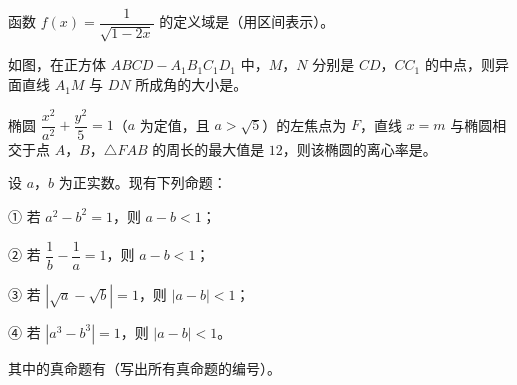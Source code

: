 \begin{question}
函数 $f(x)=\dfrac1{\sqrt{1-2x}}$ 的定义域是\gkblank{}（用区间表示）。

\Needspace{0.4\textheight}
\end{question}
\begin{question}
如图，在正方体 $ABCD-A_1B_1C_1D_1$ 中，$M$，$N$ 分别是 $CD$，$CC_1$ 的中点，则异面直线 $A_1M$ 与 $DN$ 所成角的大小是\gkblank{}。
\nopagebreak[4]
\begin{center}\end{center}
\nopagebreak[4]
\end{question}
\begin{question}
椭圆 $\dfrac{x^2}{a^2}+\dfrac{y^2}5=1$（$a$ 为定值，且 $a>\sqrt5$）的左焦点为 $F$，直线 $x=m$ 与椭圆相交于点 $A$，$B$，$\triangle FAB$ 的周长的最大值是 $12$，则该椭圆的离心率是\gkblank{}。

\end{question}
\begin{question}
设 $a$，$b$ 为正实数。现有下列命题：

① 若 $a^2-b^2=1$，则 $a-b<1$；

② 若 $\dfrac1b-\dfrac1a=1$，则 $a-b<1$；

③ 若 $|\sqrt a-\sqrt b|=1$，则 $|a-b|<1$；

④ 若 $|a^3-b^3|=1$，则 $|a-b|<1$。

其中的真命题有\gkblank{}（写出所有真命题的编号）。

\end{question}

